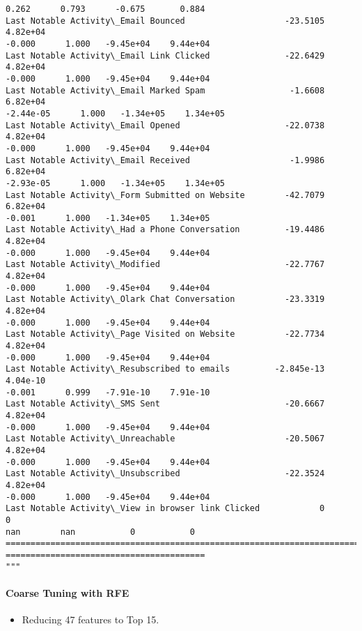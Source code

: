 \documentclass[11pt]{article}
\providecommand{\tightlist}{%
      \setlength{\itemsep}{0pt}\setlength{\parskip}{0pt}}
\begin{document}
\begin{tcolorbox}[breakable, size=fbox, boxrule=.5pt, pad at break*=1mm, opacityfill=0]
\begin{Verbatim}[commandchars=\\\{\}]
0.262      0.793      -0.675       0.884
Last Notable Activity\_Email Bounced                    -23.5105   4.82e+04
-0.000      1.000   -9.45e+04    9.44e+04
Last Notable Activity\_Email Link Clicked               -22.6429   4.82e+04
-0.000      1.000   -9.45e+04    9.44e+04
Last Notable Activity\_Email Marked Spam                 -1.6608   6.82e+04
-2.44e-05      1.000   -1.34e+05    1.34e+05
Last Notable Activity\_Email Opened                     -22.0738   4.82e+04
-0.000      1.000   -9.45e+04    9.44e+04
Last Notable Activity\_Email Received                    -1.9986   6.82e+04
-2.93e-05      1.000   -1.34e+05    1.34e+05
Last Notable Activity\_Form Submitted on Website        -42.7079   6.82e+04
-0.001      1.000   -1.34e+05    1.34e+05
Last Notable Activity\_Had a Phone Conversation         -19.4486   4.82e+04
-0.000      1.000   -9.45e+04    9.44e+04
Last Notable Activity\_Modified                         -22.7767   4.82e+04
-0.000      1.000   -9.45e+04    9.44e+04
Last Notable Activity\_Olark Chat Conversation          -23.3319   4.82e+04
-0.000      1.000   -9.45e+04    9.44e+04
Last Notable Activity\_Page Visited on Website          -22.7734   4.82e+04
-0.000      1.000   -9.45e+04    9.44e+04
Last Notable Activity\_Resubscribed to emails         -2.845e-13   4.04e-10
-0.001      0.999   -7.91e-10    7.91e-10
Last Notable Activity\_SMS Sent                         -20.6667   4.82e+04
-0.000      1.000   -9.45e+04    9.44e+04
Last Notable Activity\_Unreachable                      -20.5067   4.82e+04
-0.000      1.000   -9.45e+04    9.44e+04
Last Notable Activity\_Unsubscribed                     -22.3524   4.82e+04
-0.000      1.000   -9.45e+04    9.44e+04
Last Notable Activity\_View in browser link Clicked            0          0
nan        nan           0           0
================================================================================
========================================
"""
\end{Verbatim}
\end{tcolorbox}
        
    \hypertarget{coarse-tuning-with-rfe}{%
\paragraph{Coarse Tuning with RFE}\label{coarse-tuning-with-rfe}}

\begin{itemize}
\tightlist
\item
  Reducing 47 features to Top 15.
\end{itemize}
\end{document}
